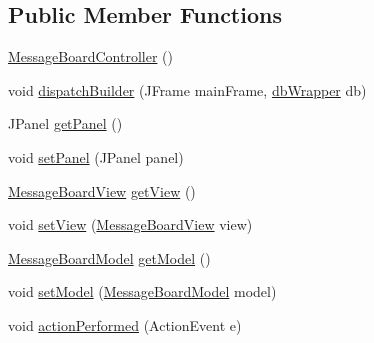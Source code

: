 \subsection*{Public Member Functions}
\begin{DoxyCompactItemize}
\item 
\mbox{\hyperlink{classcom_1_1_b_n_u_1_1pages_1_1message__board_1_1_message_board_controller_a22575105fa9eed3ea2939a623a5dded0}{Message\+Board\+Controller}} ()
\item 
void \mbox{\hyperlink{classcom_1_1_b_n_u_1_1pages_1_1message__board_1_1_message_board_controller_a88fa94e1e63a41e3e02e27affbb3ba18}{dispatch\+Builder}} (J\+Frame main\+Frame, \mbox{\hyperlink{interfacecom_1_1_b_n_u_1_1database_1_1db_wrapper}{db\+Wrapper}} db)
\item 
J\+Panel \mbox{\hyperlink{classcom_1_1_b_n_u_1_1pages_1_1message__board_1_1_message_board_controller_a6884ba0f7c1e4552413b5cb7c5c4f34f}{get\+Panel}} ()
\item 
void \mbox{\hyperlink{classcom_1_1_b_n_u_1_1pages_1_1message__board_1_1_message_board_controller_a0e9193f4279af6645afd866507a12e82}{set\+Panel}} (J\+Panel panel)
\item 
\mbox{\hyperlink{classcom_1_1_b_n_u_1_1pages_1_1message__board_1_1_message_board_view}{Message\+Board\+View}} \mbox{\hyperlink{classcom_1_1_b_n_u_1_1pages_1_1message__board_1_1_message_board_controller_adbd1cc1f40c5e1fc61214a716832aac7}{get\+View}} ()
\item 
void \mbox{\hyperlink{classcom_1_1_b_n_u_1_1pages_1_1message__board_1_1_message_board_controller_ab31c9e7e0c1487a877acddd610bc5f4b}{set\+View}} (\mbox{\hyperlink{classcom_1_1_b_n_u_1_1pages_1_1message__board_1_1_message_board_view}{Message\+Board\+View}} view)
\item 
\mbox{\hyperlink{classcom_1_1_b_n_u_1_1pages_1_1message__board_1_1_message_board_model}{Message\+Board\+Model}} \mbox{\hyperlink{classcom_1_1_b_n_u_1_1pages_1_1message__board_1_1_message_board_controller_a9293c756e3ff85cb04d67cb2423edf3c}{get\+Model}} ()
\item 
void \mbox{\hyperlink{classcom_1_1_b_n_u_1_1pages_1_1message__board_1_1_message_board_controller_a62cc51202d330d7779522040271edc9f}{set\+Model}} (\mbox{\hyperlink{classcom_1_1_b_n_u_1_1pages_1_1message__board_1_1_message_board_model}{Message\+Board\+Model}} model)
\item 
void \mbox{\hyperlink{classcom_1_1_b_n_u_1_1pages_1_1message__board_1_1_message_board_controller_a5af311fbe1b8bb456fa092bfbfc12cd3}{action\+Performed}} (Action\+Event e)
\end{DoxyCompactItemize}
